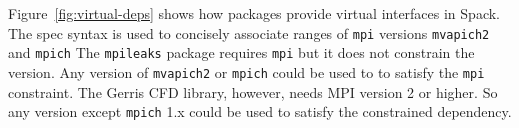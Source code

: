 Figure~\ref{fig:virtual-deps} shows how packages provide
virtual interfaces in Spack.  The spec syntax is used to concisely
associate ranges of {\tt mpi} versions {\tt mvapich2} and {\tt mpich}
The {\tt mpileaks} package requires {\tt mpi} but it does not constrain the version.
Any version of {\tt mvapich2} or {\tt mpich} could be used to to satisfy the {\tt mpi}
constraint. The Gerris CFD library, however, needs MPI version 2 or higher.  So any
version except {\tt mpich} 1.x could be used to satisfy the constrained dependency.





